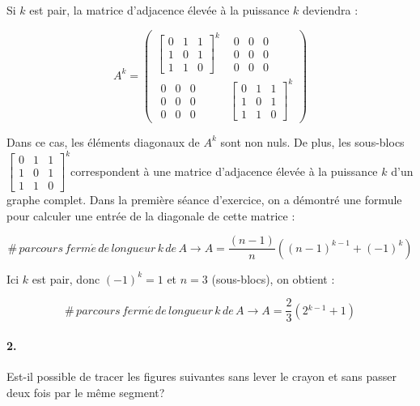\begin{solution}
Si $k$ est pair, la matrice d'adjacence élevée à la puissance $k$
deviendra :

\[
A^{k}=\left(\begin{array}{cc}
\left[\begin{array}{ccc}
0 & 1 & 1\\
1 & 0 & 1\\
1 & 1 & 0
\end{array}\right]^{k} & \begin{array}{ccc}
0 & 0 & 0\\
0 & 0 & 0\\
0 & 0 & 0
\end{array}\\
\begin{array}{ccc}
0 & 0 & 0\\
0 & 0 & 0\\
0 & 0 & 0
\end{array} & \left[\begin{array}{ccc}
0 & 1 & 1\\
1 & 0 & 1\\
1 & 1 & 0
\end{array}\right]^{k}
\end{array}\right)
\]


Dans ce cas, les éléments diagonaux de $A^{k}$ sont non nuls. De
plus, les sous-blocs $\left[\begin{array}{ccc}
0 & 1 & 1\\
1 & 0 & 1\\
1 & 1 & 0
\end{array}\right]^{k}$correspondent à une matrice d'adjacence élevée à la puissance $k$
d'un graphe complet. Dans la première séance d'exercice, on a démontré
une formule pour calculer une entrée de la diagonale de cette matrice
: 

\[
\#\, parcours\, ferm\acute{e}\, de\, longueur\, k\, de\, A\rightarrow A=\frac{(n-1)}{n}((n-1)^{k-1}+(-1)^{k})
\]


Ici $k$ est pair, donc $(-1)^{k}=1$ et $n=3$ (sous-blocs), on obtient
:

\[
\#\, parcours\, ferm\acute{e}\, de\, longueur\, k\, de\, A\rightarrow A=\frac{2}{3}(2{}^{k-1}+1)
\]
\end{solution}

\paragraph{2. } Est-il possible de tracer les figures suivantes sans lever le crayon et sans passer deux fois par le même segment?

